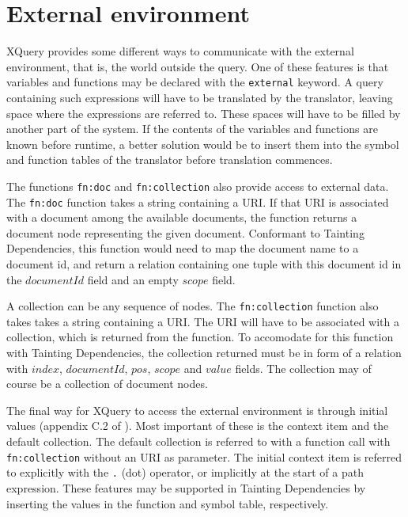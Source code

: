 \section{External environment}
\label{sect:disc:ctxItem}

XQuery provides some different ways to communicate with the external environment, that is, the world outside the
query. One of these features is that variables and functions may be declared with the \texttt{external} keyword. A
query containing such expressions will have to be translated by the translator, leaving space where the
expressions are referred to. These spaces will have to be filled by another
part of the system. If the contents of the variables and functions are known before runtime, a better solution would be to insert them into the symbol
and function tables of the translator before translation commences.

The functions \texttt{fn:doc} and \texttt{fn:collection} also provide access to external data. The \texttt{fn:doc}
function takes a string containing a URI. If that URI is associated with a document among the available documents,
the function returns a document node representing the given document. Conformant to Tainting Dependencies, this
function would need to map the document name to a document id, and return a relation containing one tuple with
this document id in the $documentId$ field and an empty $scope$ field.

A collection can be any sequence of nodes. The \texttt{fn:collection} function also takes takes a string
containing a URI. The URI will have to be associated with a collection, which is returned from the function. To
accomodate for this function with Tainting Dependencies, the collection returned must be in form of a relation
with $index$, $documentId$, $pos$, $scope$ and $value$ fields. The collection may of course be a collection of
document nodes.

The final way for XQuery to access the external environment is through initial values (appendix C.2 of
\cite{w3c00}). Most important of these is the context item and the default collection. The default collection is
referred to with a function call with \texttt{fn:collection} without an URI as parameter. The initial context item
is referred to explicitly with the \verb!.! (dot) operator, or implicitly at the start of a path expression. These
features may be supported in Tainting Dependencies by inserting the values in
the function and symbol table, respectively.